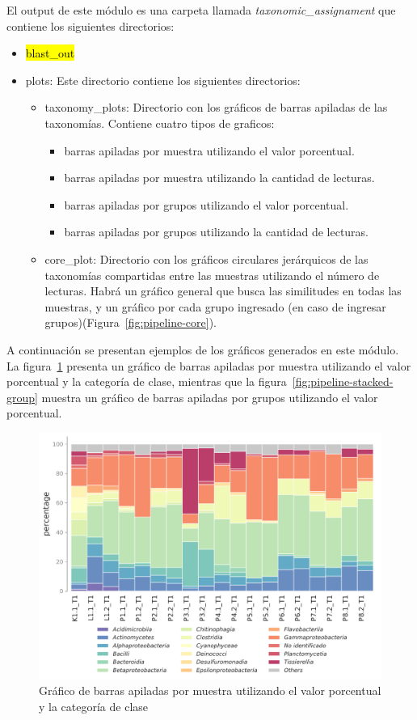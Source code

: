 El output de este módulo es una carpeta llamada \textit{taxonomic\_assignament} que contiene los siguientes directorios:
\begin{itemize}
\item \hl{blast\_out}
\item plots: Este directorio contiene los siguientes directorios:
\begin{itemize}
    \item taxonomy\_plots: Directorio con los gráficos de barras apiladas de las taxonomías. Contiene cuatro tipos de graficos: 
    \begin{itemize}
        \item barras apiladas por muestra utilizando el valor porcentual.
        \item barras apiladas por muestra utilizando la cantidad de lecturas.
        \item barras apiladas por grupos utilizando el valor porcentual.
        \item barras apiladas por grupos utilizando la cantidad de lecturas.
    \end{itemize}
    \item core\_plot: Directorio con los gráficos circulares jerárquicos de las taxonomías compartidas entre las muestras utilizando el número de lecturas. Habrá un gráfico general que busca las similitudes en todas las muestras, y un gráfico por cada grupo ingresado (en caso de ingresar grupos)(Figura~\ref{fig:pipeline-core}).
\end{itemize}
 \end{itemize}
A continuación se presentan ejemplos de los gráficos generados en este módulo. La figura~\ref{fig:pipeline-stacked-sample} presenta un gráfico de barras apiladas por muestra utilizando el valor porcentual y la categoría de clase, mientras que la figura~\ref{fig:pipeline-stacked-group} muestra un gráfico de barras apiladas por grupos utilizando el valor porcentual.
\begin{figure}[H]
    \centering
    \includegraphics[width=1\linewidth,height=0.4\textheight]{images/pipeline/class_samples_percentage.pdf}
    \caption{Gráfico de barras apiladas por muestra utilizando el valor porcentual y la categoría de clase}
    \label{fig:pipeline-stacked-sample}
\end{figure}
